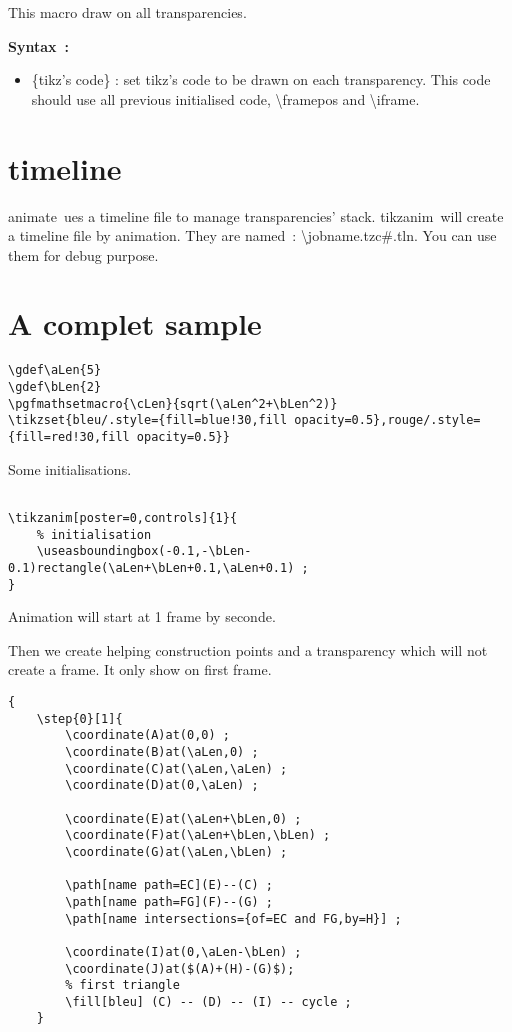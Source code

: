 \documentclass[a4paper,12pt]{article}
\newcommand\Tikz{{\ttfamily tikz}}
\newcommand\TikzAnimate{{\ttfamily tikzanim}}
\newcommand\Animate{{\ttfamily animate}}
\begin{document}
This macro draw on all transparencies.

\textbf{Syntax~:}


	\begin{itemize}
		\item {\ttfamily\{tikz's code\}} : set \Tikz's code to be drawn on each transparency. This code should use all previous initialised code,
		{\ttfamily\textbackslash framepos} and {\ttfamily\textbackslash iframe}.
	\end{itemize}
	
\section{\ttfamily timeline}

\Animate\ ues a {\ttfamily timeline} file to manage transparencies' stack. \TikzAnimate\ will create a {\ttfamily timeline} file by animation. They are named~: {\ttfamily \textbackslash jobname.tzc\#.tln}. You can use them for debug purpose.
	
\section{A complet sample}

\begin{lstlisting}[name=exemplecomplet]
\gdef\aLen{5}
\gdef\bLen{2}
\pgfmathsetmacro{\cLen}{sqrt(\aLen^2+\bLen^2)}
\tikzset{bleu/.style={fill=blue!30,fill opacity=0.5},rouge/.style={fill=red!30,fill opacity=0.5}} 
\end{lstlisting}

Some initialisations.


\begin{lstlisting}[name=exemplecomplet]

\tikzanim[poster=0,controls]{1}{
	% initialisation 
	\useasboundingbox(-0.1,-\bLen-0.1)rectangle(\aLen+\bLen+0.1,\aLen+0.1) ;
}	
\end{lstlisting}

Animation will start at 1 frame by seconde.

Then we create helping construction points and a transparency which will not create a frame. It only show on first frame.

\begin{lstlisting}[name=exemplecomplet]
{
	\step{0}[1]{		
		\coordinate(A)at(0,0) ;
		\coordinate(B)at(\aLen,0) ;
		\coordinate(C)at(\aLen,\aLen) ;
		\coordinate(D)at(0,\aLen) ;

		\coordinate(E)at(\aLen+\bLen,0) ;
		\coordinate(F)at(\aLen+\bLen,\bLen) ;
		\coordinate(G)at(\aLen,\bLen) ;

		\path[name path=EC](E)--(C) ;
		\path[name path=FG](F)--(G) ;
		\path[name intersections={of=EC and FG,by=H}] ;

		\coordinate(I)at(0,\aLen-\bLen) ;
		\coordinate(J)at($(A)+(H)-(G)$);
		% first triangle
		\fill[bleu] (C) -- (D) -- (I) -- cycle ;
	}
\end{lstlisting}
\end{document}
